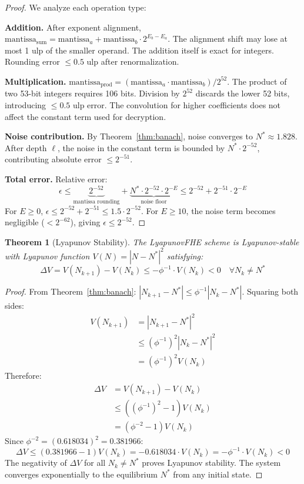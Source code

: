 \documentclass[11pt,a4paper]{article}
\newtheorem{theorem}{Theorem}[section]
\begin{document}
\begin{proof}
We analyze each operation type:

\textbf{Addition.} After exponent alignment, $\text{mantissa}_{\text{sum}} = \text{mantissa}_a + \text{mantissa}_b \cdot 2^{E_b-E_a}$. The alignment shift may lose at most 1 ulp of the smaller operand. The addition itself is exact for integers. Rounding error $\leq 0.5$ ulp after renormalization.

\textbf{Multiplication.} $\text{mantissa}_{\text{prod}} = (\text{mantissa}_a \cdot \text{mantissa}_b) / 2^{52}$. The product of two 53-bit integers requires 106 bits. Division by $2^{52}$ discards the lower 52 bits, introducing $\leq 0.5$ ulp error. The convolution for higher coefficients does not affect the constant term used for decryption.

\textbf{Noise contribution.} By Theorem~\ref{thm:banach}, noise converges to $N^* \approx 1.828$. After depth $\ell$, the noise in the constant term is bounded by $N^* \cdot 2^{-52}$, contributing absolute error $\leq 2^{-51}$. 

\textbf{Total error.} Relative error:
\[
\epsilon \leq \underbrace{2^{-52}}_{\text{mantissa rounding}} + \underbrace{N^* \cdot 2^{-52} \cdot 2^{-E}}_{\text{noise floor}} \leq 2^{-52} + 2^{-51} \cdot 2^{-E}
\]
For $E \geq 0$, $\epsilon \leq 2^{-52} + 2^{-51} \leq 1.5 \cdot 2^{-52}$. For $E \geq 10$, the noise term becomes negligible ($< 2^{-62}$), giving $\epsilon \leq 2^{-52}$.
\end{proof}

\begin{theorem}[Lyapunov Stability]
\label{thm:lyapunov_stability}
The LyapunovFHE scheme is Lyapunov-stable with Lyapunov function $V(N) = |N - N^*|^2$ satisfying:
\[
\Delta V = V(N_{k+1}) - V(N_k) \leq -\phi^{-1} \cdot V(N_k) < 0 \quad \forall N_k \neq N^*
\]
\end{theorem}

\begin{proof}
From Theorem~\ref{thm:banach}: $|N_{k+1} - N^*| \leq \phi^{-1}|N_k - N^*|$. Squaring both sides:
\begin{align*}
V(N_{k+1}) &= |N_{k+1} - N^*|^2 \\
&\leq (\phi^{-1})^2 |N_k - N^*|^2 \\
&= (\phi^{-1})^2 V(N_k)
\end{align*}
Therefore:
\begin{align*}
\Delta V &= V(N_{k+1}) - V(N_k) \\
&\leq ((\phi^{-1})^2 - 1) V(N_k) \\
&= (\phi^{-2} - 1) V(N_k)
\end{align*}
Since $\phi^{-2} = (0.618034)^2 = 0.381966$:
\[
\Delta V \leq (0.381966 - 1) V(N_k) = -0.618034 \cdot V(N_k) = -\phi^{-1} \cdot V(N_k) < 0
\]
The negativity of $\Delta V$ for all $N_k \neq N^*$ proves Lyapunov stability. The system converges exponentially to the equilibrium $N^*$ from any initial state.
\end{proof}
\end{document}
